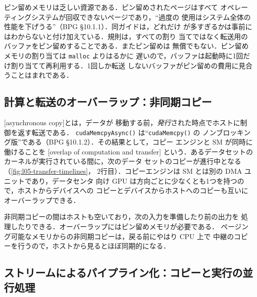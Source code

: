 \documentclass[../main.tex]{subfiles}
\begin{document}
ピン留めメモリは乏しい資源である．ピン留めされたページはすべて
オペレーティングシステムが回収できないページであり，\enquote{過度の
使用はシステム全体の性能を下げうる}（BPG §10.1.1）．同ガイドは，どれだけ
が多すぎるかは事前にはわからないと付け加えている．規則は，すべての割り
当てではなく転送用のバッファをピン留めすることである．またピン留めは
無償でもない．ピン留めメモリの割り当ては \texttt{malloc} よりはるかに
遅いので，バッファは起動時に1回だけ割り当てて再利用する．1回しか転送
しないバッファがピン留めの費用に見合うことはまれである．

\subsection{計算と転送のオーバーラップ：非同期コピー}

\begin{definition}
  [asynchronous copy]とは，データが
  移動する前，\emph{発行}された時点でホストに制御を返す転送である．
  \texttt{cudaMemcpyAsync()} は\enquote{\texttt{cudaMemcpy()} の
  ノンブロッキング版}である（BPG §10.1.2）．その結果として，コピー
  エンジンと SM が同時に働けることを
  [overlap of computation and transfer]
  という．あるデータセットのカーネルが実行されている間に，次のデータ
  セットのコピーが進行中となる（\cref{fig:l05-transfer-timelines}，
  2行目）．コピーエンジンは SM とは別の DMA ユニットであり，データセンタ
  向け GPU は方向ごとに少なくとも1つを持つので，ホストからデバイスへの
  コピーとデバイスからホストへのコピーも互いにオーバーラップできる．
\end{definition}

非同期コピーの間はホストも空いており，次の入力を準備したり前の出力を
処理したりできる．オーバーラップにはピン留めメモリが必要である．
ページング可能なメモリからの非同期コピーは，戻る前にやはり CPU 上で
中継のコピーを行うので，ホストから見るとほぼ同期的になる．

\subsection{ストリームによるパイプライン化：コピーと実行の並行処理}
\end{document}
